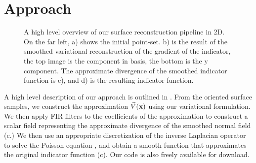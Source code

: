 \section{Approach}
\label{sec:pipeline}
\begin{figure*} 
	\centering
	
	\caption{A high level overview of our surface reconstruction pipeline in 2D. On the far left, a) shows the initial point-set. b) is the result of the smoothed variational reconstruction of the gradient of the indicator, the top image is the component in basis, the bottom is the y component. The approximate divergence of the smoothed indicator function is c), and d) is the resulting indicator function. }
	\label{fig:pipeline}
\end{figure*}

A high level description of our approach is outlined in . From the oriented surface samples, we construct the approximation $\vec{V}(\mathbf{x})$ using our variational formulation. We then apply FIR filters to the coefficients of the approximation to construct a scalar field representing the approximate divergence of the smoothed normal field (c.) We then use an appropriate discretization of the inverse Laplacian operator to solve the Poisson equation , and obtain a smooth function that approximates the original indicator function (c). Our code is also freely available for download.


